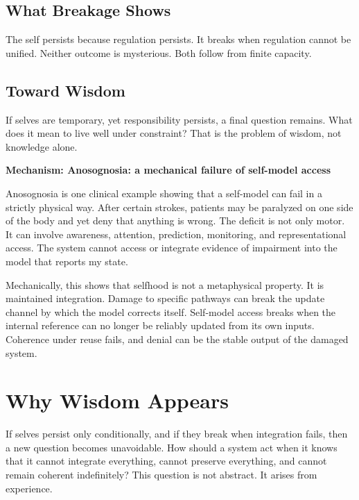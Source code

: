 \documentclass[11pt,twoside,openright]{book}
\newenvironment{mechanismboxpage}[1]
  {\par\medskip
   \noindent
   \begin{minipage}{\linewidth}
   \begin{framed}
   \noindent\textbf{Mechanism: #1}\par\medskip}
  {\end{framed}
   \end{minipage}
   \par\medskip}
\begin{document}
\section*{What Breakage Shows}

The self persists because regulation persists. It breaks when regulation cannot be unified. Neither outcome is mysterious. Both follow from finite capacity.

\section*{Toward Wisdom}

If selves are temporary, yet responsibility persists, a final question remains. What does it mean to live well under constraint? That is the problem of wisdom, not knowledge alone.

\begin{mechanismboxpage}{Anosognosia: a mechanical failure of self-model access}

Anosognosia is one clinical example showing that a self-model can fail in a strictly physical way. After certain strokes, patients may be paralyzed on one side of the body and yet deny that anything is wrong. The deficit is not only motor. It can involve awareness, attention, prediction, monitoring, and representational access. The system cannot access or integrate evidence of impairment into the model that reports my state.

Mechanically, this shows that selfhood is not a metaphysical property. It is maintained integration. Damage to specific pathways can break the update channel by which the model corrects itself. Self-model access breaks when the internal reference can no longer be reliably updated from its own inputs. Coherence under reuse fails, and denial can be the stable output of the damaged system.

\end{mechanismboxpage}

\chapter{Why Wisdom Appears}
\label{ch:wisdom_appears}

If selves persist only conditionally, and if they break when integration fails, then a new question becomes unavoidable. How should a system act when it knows that it cannot integrate everything, cannot preserve everything, and cannot remain coherent indefinitely? This question is not abstract. It arises from experience.
\end{document}
